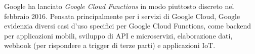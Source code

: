 Google ha lanciato \textit{Google Cloud Functions} in modo piuttosto discreto nel febbraio 2016. Pensata principalmente per i servizi di Google Cloud, Google evidenzia diversi casi d'uso specifici per Google Cloud Functions, come backend per applicazioni mobili, sviluppo di API e microservizi, elaborazione dati, webhook (per rispondere a trigger di terze parti) e applicazioni IoT.\cite{lynn2017preliminary}